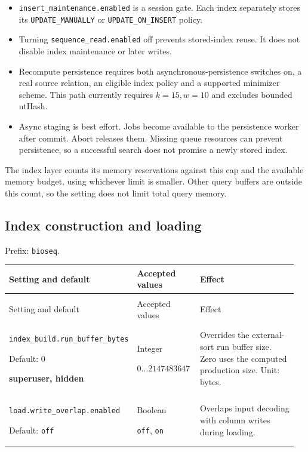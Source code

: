 \begin{itemize}
  \item \texttt{insert\_maintenance.enabled} is a session gate. Each index
    separately stores its \texttt{UPDATE\_MANUALLY} or
    \texttt{UPDATE\_ON\_INSERT} policy.
  \item Turning \texttt{sequence\_read.enabled} off prevents stored-index
    reuse. It does not disable index maintenance or later writes.
  \item Recompute persistence requires both asynchronous-persistence switches
    on, a real source relation, an eligible index policy and a supported
    minimizer scheme. This path currently requires $k=15,w=10$ and excludes
    bounded ntHash.
  \item Async staging is best effort. Jobs become available to the persistence
    worker after commit. Abort releases them. Missing queue resources can
    prevent persistence, so a successful search does not promise a newly
    stored index.
\end{itemize}
The index layer counts its memory reservations against this cap and the
available memory budget, using whichever limit is smaller. Other query buffers
are outside this count, so the setting does not limit total query memory.

\subsection{Index construction and loading}

Prefix: \nolinkurl{bioseq}.

\begingroup
\small
\setlength{\tabcolsep}{4pt}
\renewcommand{\arraystretch}{1.16}
\begin{longtable}{@{}>{\raggedright\arraybackslash}p{0.34\linewidth}>{\raggedright\arraybackslash}p{0.22\linewidth}>{\raggedright\arraybackslash}p{0.40\linewidth}@{}}
\toprule
Setting and default & Accepted values & Effect \\
\midrule
\endfirsthead
\multicolumn{3}{@{}l}{Prefix: \nolinkurl{bioseq} (continued)} \\
\toprule
Setting and default & Accepted values & Effect \\
\midrule
\endhead
\bottomrule
\endfoot
\nolinkurl{index_build.run_buffer_bytes}\par Default: 0\par \textbf{superuser, hidden} & Integer\par $0\ldots 2147483647$ & Overrides the external-sort run buffer size. Zero uses the computed production size. Unit: bytes. \\[4pt]
\nolinkurl{load.write_overlap.enabled}\par Default: \texttt{off} & Boolean\par \texttt{off}, \texttt{on} & Overlaps input decoding with column writes during loading. \\[4pt]
\end{longtable}
\endgroup

